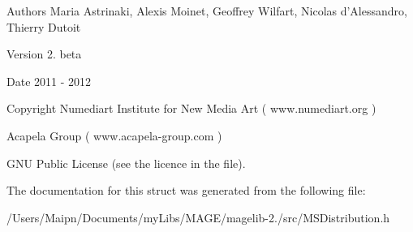\begin{DoxyAuthor}{Authors}
Maria Astrinaki, Alexis Moinet, Geoffrey Wilfart, Nicolas d'Alessandro, Thierry Dutoit
\end{DoxyAuthor}
\begin{DoxyVersion}{Version}
2. beta 
\end{DoxyVersion}
\begin{DoxyDate}{Date}
2011 -\/ 2012 
\end{DoxyDate}
\begin{DoxyCopyright}{Copyright}
Numediart Institute for New Media Art ( www.\-numediart.\-org ) \par
 Acapela Group ( www.\-acapela-\/group.\-com ) \par
 G\-N\-U Public License (see the licence in the file). 
\end{DoxyCopyright}


The documentation for this struct was generated from the following file\-:\begin{DoxyCompactItemize}
\item 
/\-Users/\-Maipn/\-Documents/my\-Libs/\-M\-A\-G\-E/magelib-\/2./src/M\-S\-Distribution.\-h\end{DoxyCompactItemize}
